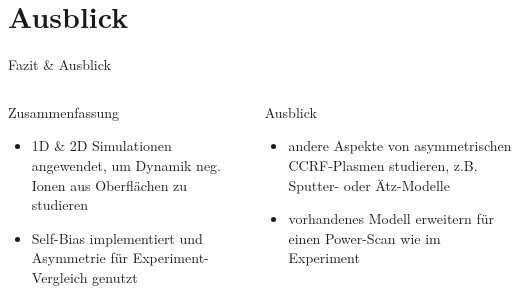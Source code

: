 \documentclass{beamer}
\newcommand{\stichpunkt}[1]{\begin{itemize} \item #1 \end{itemize}}
\begin{document}
	\section{Ausblick}
		\begin{frame}{Fazit \& Ausblick}
			\begin{columns}
				\begin{column}{0.46\textwidth}
					\begin{alertblock}{Zusammenfassung}%
						\stichpunkt{1D \& 2D Simulationen angewendet, um Dynamik neg. Ionen aus Oberflächen zu studieren}%
						\stichpunkt{Self-Bias implementiert und Asymmetrie für Experiment-Vergleich genutzt}
					\end{alertblock}
				\end{column}
				\begin{column}{0.46\textwidth}
					\begin{exampleblock}{Ausblick}%
						\stichpunkt{andere Aspekte von asymmetrischen CCRF-Plasmen studieren, %
									z.B. Sputter- oder Ätz-Modelle}%
						\stichpunkt{vorhandenes Modell erweitern für einen Power-Scan wie im Experiment}
					\end{exampleblock}
				\end{column}
			\end{columns}
		\end{frame}
\end{document}
